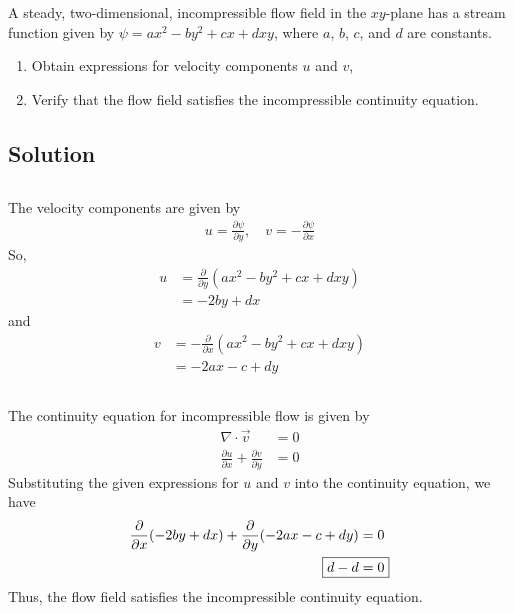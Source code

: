 \section{}
A steady, two-dimensional, incompressible flow field in the $xy$-plane has a stream function given by $\psi = ax^2 - by^2 + cx + dxy$, where $a$, $b$, $c$, and $d$ are constants.
\begin{enumerate}[label=(\alph*)]
    \item Obtain expressions for velocity components $u$ and $v$,
    \item Verify that the flow field satisfies the incompressible continuity equation.
\end{enumerate}

\subsection*{Solution}
\subsection{}
The velocity components are given by
\begin{align*}
    u = \frac{\partial \psi}{\partial y}, \quad v = -\frac{\partial \psi}{\partial x}
\end{align*}
So,
\begin{align*}
    u &= \frac{\partial}{\partial y}(ax^2 - by^2 + cx + dxy) \\
    &= \boxed{-2by + dx}
\end{align*}
and
\begin{align*}
    v &= -\frac{\partial}{\partial x}(ax^2 - by^2 + cx + dxy) \\
    &= \boxed{-2ax - c + dy}
\end{align*}

\subsection{}
The continuity equation for incompressible flow is given by
\begin{align*}
    \nabla \cdot \vec{v} &= 0 \\
    \frac{\partial u}{\partial x} + \frac{\partial v}{\partial y} &= 0
\end{align*}
Substituting the given expressions for $u$ and $v$ into the continuity equation, we have
\begin{align*}
    \frac{\partial}{\partial x}(-2by + dx) + \frac{\partial}{\partial y}(-2ax - c + dy) &= 0 \\
    \Aboxed{d - d &= 0}
\end{align*}
Thus, the flow field satisfies the incompressible continuity equation.

